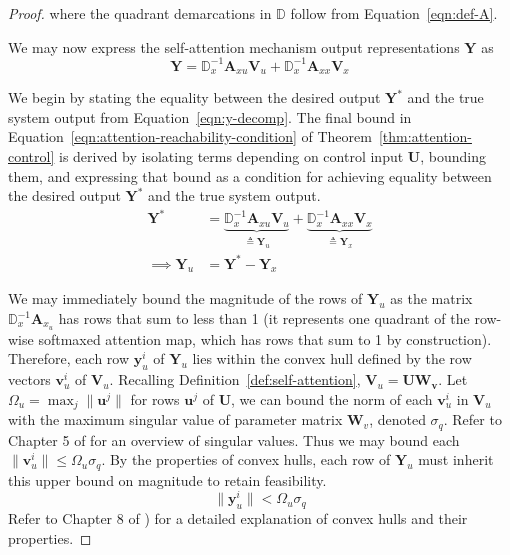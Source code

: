 \documentclass{article} %
\begin{document}
\begin{proof}
    where the quadrant demarcations in $\mathbb D$ follow from Equation~\ref{eqn:def-A}. 

    We may now express the self-attention mechanism output representations $\mathbf Y$ as 
    \begin{equation}
        \label{eqn:y-decomp}
        \mathbf Y = \mathbb D_x^{-1} \mathbf A_{xu} \mathbf V_u + \mathbb D_x^{-1} \mathbf A_{xx} \mathbf V_x
    \end{equation}

     

    We begin by stating the equality between the desired output $\mathbf Y^*$ and the true system output from Equation~\ref{eqn:y-decomp}. The final bound in Equation~\ref{eqn:attention-reachability-condition} of Theorem~\ref{thm:attention-control} is derived by isolating terms depending on control input $\mathbf U$, bounding them, and expressing that bound as a condition for achieving equality between the desired output $\mathbf Y^*$ and the true system output.
    \begin{align}
        \label{eqn:init-equality}
        \mathbf Y^* &= 
        \underbrace{
            \mathbb D_x^{-1} \mathbf A_{xu} \mathbf V_u
        }_{
            \triangleq \mathbf Y_u
        }+ 
        \underbrace{
            \mathbb D_x^{-1} \mathbf A_{xx} \mathbf V_x 
        }_{
            \triangleq \mathbf Y_x
        } \\ 
        \implies \mathbf Y_u &= \mathbf Y^* - \mathbf Y_x
    \end{align}


    We may immediately bound the magnitude of the rows of $\mathbf Y_u$ as the matrix $\mathbb D_x^{-1} \mathbf A_{x_u}$ has rows that sum to less than 1 (it represents one quadrant of the row-wise softmaxed attention map, which has rows that sum to 1 by construction). 
    Therefore, each row $\mathbf y_u^i$ of $\mathbf Y_u$ lies within the convex hull defined by the row vectors $\mathbf v_u^i$ of $\mathbf V_u$. 
    Recalling Definition~\ref{def:self-attention}, $\mathbf V_u = \mathbf {U W_v}$. Let $\Omega_u = \max_j \|\mathbf u^j\|$ for rows $\mathbf u^j$ of $\mathbf U$, we can bound the norm of each $\mathbf v_u^i$ in $\mathbf V_u$ with the maximum singular value of parameter matrix $\mathbf W_v$, denoted $\sigma_q$. 
    Refer to Chapter 5 of \cite{367_optimization_models} for an overview of singular values. 
    Thus we may bound each $\| \mathbf v_u^i \| \leq \Omega_u \sigma_q$. By the properties of convex hulls, each row of $\mathbf Y_u$ must inherit this upper bound on magnitude to retain feasibility.
    \begin{equation}
        \label{eqn:y_u_bound}
        \| \mathbf y_u^i \| < \Omega_u \sigma_q 
    \end{equation}
    Refer to Chapter 8 of \cite{367_optimization_models}) for a detailed explanation of convex hulls and their properties. 


\end{proof}
\end{document}
